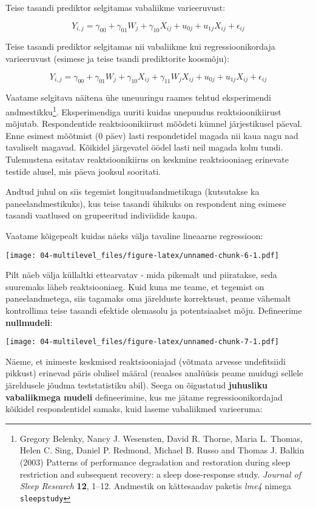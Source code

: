 \documentclass[
]{book}
\begin{document}
Teise tasandi prediktor selgitamas vabaliikme varieeruvust:

\[Y_{i,j} = \gamma_{00}+ \gamma_{01}W_j + \gamma_{10}X_{ij} + u_{0j} + u_{1j}X_{ij} + \epsilon_{ij}\]

Teise tasandi prediktor selgitamas nii vabaliikme kui regressioonikordaja varieeruvust (esimese ja teise tsandi prediktorite koosmõju):

\[Y_{i,j} = \gamma_{00}+ \gamma_{01}W_j  + \gamma_{10}X_{ij}+ \gamma_{11}W_jX_{ij}+  u_{0j} + u_{1j}X_{ij} + \epsilon_{ij}\]

Vaatame selgitava näitena ühe uneuuringu raames tehtud eksperimendi andmestikku\footnote{Gregory Belenky, Nancy J. Wesensten, David R. Thorne, Maria L. Thomas, Helen C. Sing, Daniel P. Redmond, Michael B. Russo and Thomas J. Balkin (2003) Patterns of performance degradation and restoration during sleep restriction and subsequent recovery: a sleep dose-response study. \emph{Journal of Sleep Research} \textbf{12}, 1--12. Andmestik on kättesaadav paketis \emph{lme4} nimega \texttt{sleepstudy}}. Eksperimendiga uuriti kuidas unepuudus reaktsioonikiirust mõjutab. Respondentide reaktsioonikiirust mõõdeti kümnel järjestikusel päeval. Enne esimest mõõtmist (0 päev) lasti respondetidel magada nii kaua nagu nad tavaliselt magavad. Kõikidel järgevatel öödel lasti neil magada kolm tundi. Tulemustena esitatav reaktsioonikiirus on keskmine reaktsiooniaeg erinevate testide alusel, mis päeva jooksul sooritati.

Andtud juhul on siis tegemist longituudandmetikuga (kutsutakse ka paneelandmestikuks), kus teise tasandi ühikuks on respondent ning esimese tasandi vaatlused on grupeeritud indiviidide kaupa.

Vaatame kõigepealt kuidas näeks välja tavaline lineaarne regressioon:

\texttt{[image: 04-multilevel\_files/figure-latex/unnamed-chunk-6-1.pdf]}

Pilt näeb välja küllaltki ettearvatav - mida pikemalt und piiratakse, seda suuremaks läheb reaktsiooniaeg. Kuid kuna me teame, et tegemist on paneelandmetega, siis tagamaks oma järelduste korrektsust, peame vähemalt kontrollima teise tasandi efektide olemasolu ja potentsiaalset mõju. Defineerime \textbf{nullmudeli}:

\texttt{[image: 04-multilevel\_files/figure-latex/unnamed-chunk-7-1.pdf]}

Näeme, et inimeste keskmised reaktsiooniajad (võtmata arvesse undefitsiidi pikkust) erinevad päris olulisel määral (reaalses analüüsis peame muidugi sellele järeldusele jõudma teststatistiku abil). Seega on õigustatud \textbf{juhusliku vabaliikmega mudeli} defineerimine, kus me jätame regressioonikordajad kõikidel respondentidel samaks, kuid laseme vabaliikmed varieeruma:
\end{document}
